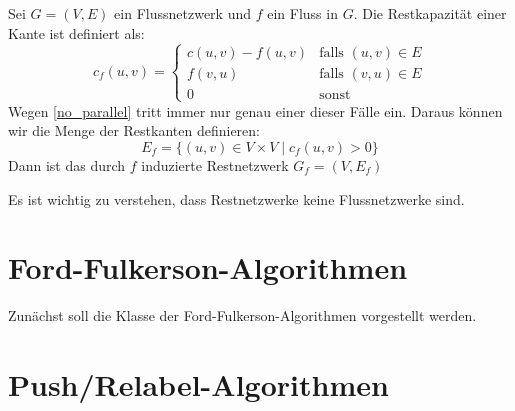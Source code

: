 \documentclass[12pt,a4paper,titlepage,onecolumn,ngerman]{scrartcl}
\newcommand{\ff}{Ford-Fulkerson}
\newcommand{\pr}{Push/Relabel}
\begin{document}
Sei $G=(V,E)$ ein Flussnetzwerk und $f$ ein Fluss in $G$.
Die Restkapazität einer Kante ist definiert als:
\begin{equation}\label{residual_capacity}
    c_{f}(u,v) = 
    \begin{cases}
        c(u,v) - f(u,v) & \text{falls $(u,v)\in E$}\\
        f(v,u) & \text{falls $(v,u) \in E$}\\
        0 & \text{sonst}
    \end{cases}
\end{equation}
Wegen \eqref{no_parallel} tritt immer nur genau einer dieser Fälle ein.
Daraus können wir die Menge der Restkanten definieren:
\begin{equation}\label{residual_edges}
    E_f = \{ (u,v) \in V \times V \mid c_{f}(u,v) > 0\}
\end{equation}
Dann ist das durch $f$ induzierte Restnetzwerk $G_f=(V,E_f)$

Es ist wichtig zu verstehen, dass Restnetzwerke keine Flussnetzwerke sind.
\section{\ff -Algorithmen}
Zunächst soll die Klasse der \ff -Algorithmen vorgestellt werden.

\section{\pr -Algorithmen}

\newpage
{}

\end{document}
